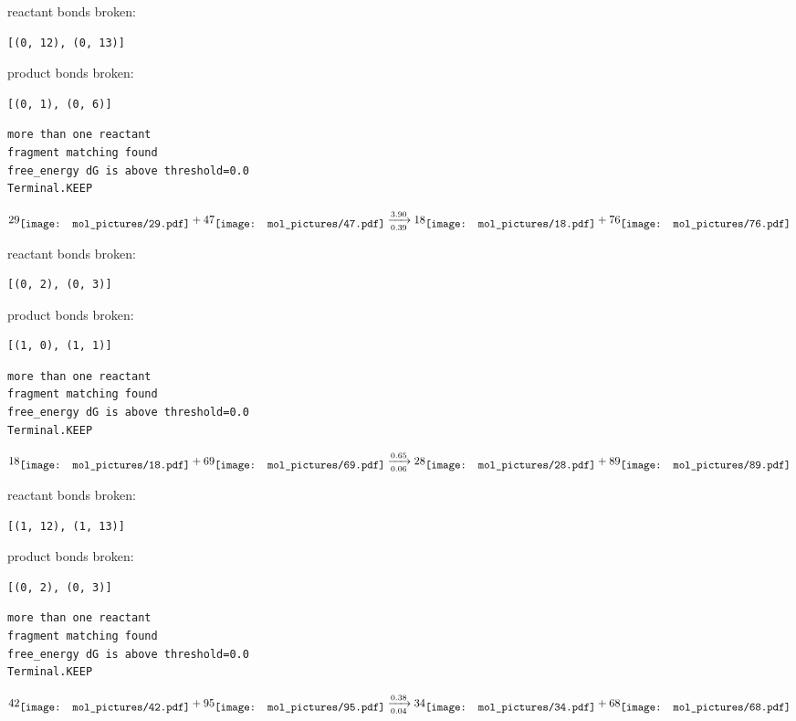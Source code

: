 \documentclass{article}
\begin{document}
reactant bonds broken:\begin{verbatim}
[(0, 12), (0, 13)]
\end{verbatim}
product bonds broken:\begin{verbatim}
[(0, 1), (0, 6)]
\end{verbatim}




\vspace{1cm}
\begin{verbatim}
more than one reactant
fragment matching found
free_energy dG is above threshold=0.0
Terminal.KEEP
\end{verbatim}
$$
29
\raisebox{-.5\height}{\texttt{[image: mol\_pictures/29.pdf]}}
+
47
\raisebox{-.5\height}{\texttt{[image: mol\_pictures/47.pdf]}}
\xrightarrow[0.39]{3.90}
18
\raisebox{-.5\height}{\texttt{[image: mol\_pictures/18.pdf]}}
+
76
\raisebox{-.5\height}{\texttt{[image: mol\_pictures/76.pdf]}}
$$


reactant bonds broken:\begin{verbatim}
[(0, 2), (0, 3)]
\end{verbatim}
product bonds broken:\begin{verbatim}
[(1, 0), (1, 1)]
\end{verbatim}




\vspace{1cm}
\begin{verbatim}
more than one reactant
fragment matching found
free_energy dG is above threshold=0.0
Terminal.KEEP
\end{verbatim}
$$
18
\raisebox{-.5\height}{\texttt{[image: mol\_pictures/18.pdf]}}
+
69
\raisebox{-.5\height}{\texttt{[image: mol\_pictures/69.pdf]}}
\xrightarrow[0.06]{0.65}
28
\raisebox{-.5\height}{\texttt{[image: mol\_pictures/28.pdf]}}
+
89
\raisebox{-.5\height}{\texttt{[image: mol\_pictures/89.pdf]}}
$$


reactant bonds broken:\begin{verbatim}
[(1, 12), (1, 13)]
\end{verbatim}
product bonds broken:\begin{verbatim}
[(0, 2), (0, 3)]
\end{verbatim}




\vspace{1cm}
\begin{verbatim}
more than one reactant
fragment matching found
free_energy dG is above threshold=0.0
Terminal.KEEP
\end{verbatim}
$$
42
\raisebox{-.5\height}{\texttt{[image: mol\_pictures/42.pdf]}}
+
95
\raisebox{-.5\height}{\texttt{[image: mol\_pictures/95.pdf]}}
\xrightarrow[0.04]{0.38}
34
\raisebox{-.5\height}{\texttt{[image: mol\_pictures/34.pdf]}}
+
68
\raisebox{-.5\height}{\texttt{[image: mol\_pictures/68.pdf]}}
$$
\end{document}
